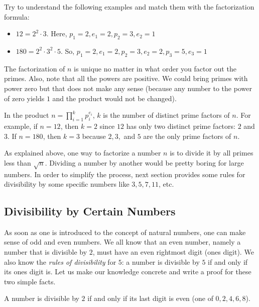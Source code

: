 \begin{example}
	Try to understand the following examples and match them with the factorization formula:
	\begin{itemize}
		\item $12=2^2\cdot3$. Here, $p_1=2,e_1=2,p_2=3,e_2=1$
		\item $180=2^2\cdot 3^2\cdot 5$. So,  $p_1=2,e_1=2,p_2=3,e_2=2,p_3=5,e_3=1$
	\end{itemize}
	The factorization of $n$ is unique no matter in what order you factor out the primes. Also, note that all the powers are positive. We could bring primes with power zero but that does not make any sense (because any number to the power of zero yields $1$ and the product would not be changed).
\end{example}

\begin{note}
	In the product $n=\prod\limits_{i=1}^{k}p_i^{e_i}$, $k$ is the number of distinct prime factors of $n$. For example, if $n=12$, then $k=2$ since $12$ has only two distinct prime factors: $2$ and $3$. If $n=180$, then $k=3$ because $2,3,$ and $5$ are the only prime factors of $n$.
\end{note}

As explained above, one way to factorize a number $n$ is to divide it by all primes less than $\sqrt n$. Dividing a number by another would be pretty boring for large numbers. In order to simplify the process, next section provides some rules for divisibility by some specific numbers like $3, 5, 7, 11$, etc.

\subsection{Divisibility by Certain Numbers}\label{subs:divrules}

As soon as one is introduced to the concept of natural numbers, one can make sense of odd and even numbers. We all know that an even number, namely a number that is divisible by $2$, must have an even rightmost digit (ones digit). We also know the \textit{rules of divisibility} for $5$: a number is divisible by $5$ if and only if its ones digit is. Let us make our knowledge concrete and write a proof for these two simple facts.

\begin{proposition}[Divisibility by $2$]
	A number is divisible by $2$ if and only if its last digit is even (one of $0,2,4,6,8$).
\end{proposition}

